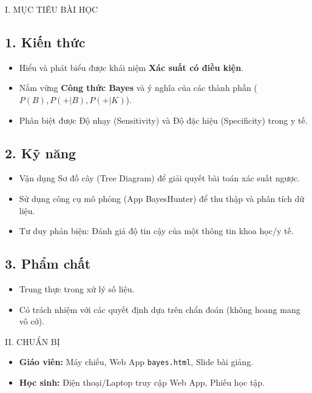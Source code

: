 \documentclass[12pt,a4paper]{article}
\begin{document}
\begin{sectionbox}{I. MỤC TIÊU BÀI HỌC}
\subsection*{1. Kiến thức}
\begin{itemize}
    \item Hiểu và phát biểu được khái niệm \textbf{Xác suất có điều kiện}.
    \item Nắm vững \textbf{Công thức Bayes} và ý nghĩa của các thành phần ($P(B), P(+|B), P(+|K)$).
    \item Phân biệt được Độ nhạy (Sensitivity) và Độ đặc hiệu (Specificity) trong y tế.
\end{itemize}

\subsection*{2. Kỹ năng}
\begin{itemize}
    \item Vận dụng Sơ đồ cây (Tree Diagram) để giải quyết bài toán xác suất ngược.
    \item Sử dụng công cụ mô phỏng (App BayesHunter) để thu thập và phân tích dữ liệu.
    \item Tư duy phản biện: Đánh giá độ tin cậy của một thông tin khoa học/y tế.
\end{itemize}

\subsection*{3. Phẩm chất}
\begin{itemize}
    \item Trung thực trong xử lý số liệu.
    \item Có trách nhiệm với các quyết định dựa trên chẩn đoán (không hoang mang vô cớ).
\end{itemize}
\end{sectionbox}

\begin{sectionbox}{II. CHUẨN BỊ}
\begin{itemize}
    \item \textbf{Giáo viên:} Máy chiếu, Web App \texttt{bayes.html}, Slide bài giảng.
    \item \textbf{Học sinh:} Điện thoại/Laptop truy cập Web App, Phiếu học tập.
\end{itemize}
\end{sectionbox}
\end{document}
